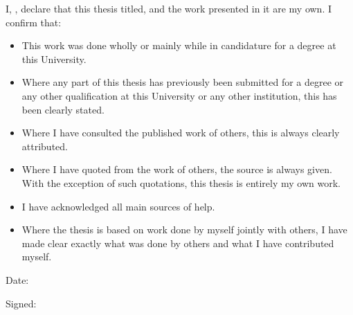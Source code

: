 
I, \showfullauthor, declare that this thesis titled, \@title
and the work presented in it are my own. I confirm that:
\begin{itemize}
\item This work was done wholly or mainly while in candidature for a \@degree degree at this University.
\item Where any part of this thesis has previously been submitted for a degree or any other qualification at this University or any other institution, this has been clearly stated.
\item Where I have consulted the published work of others, this is always clearly attributed.
\item Where I have quoted from the work of others, the source is always given. With the exception of such quotations, this thesis is entirely my own work.
\item I have acknowledged all main sources of help.
\item Where the thesis is based on work done by myself jointly with others, I have made
clear exactly what was done by others and what I have contributed myself.
\end{itemize}

\vspace{4cm}

\noindent
Date:
\vspace{1cm}

\noindent
Signed:
  
